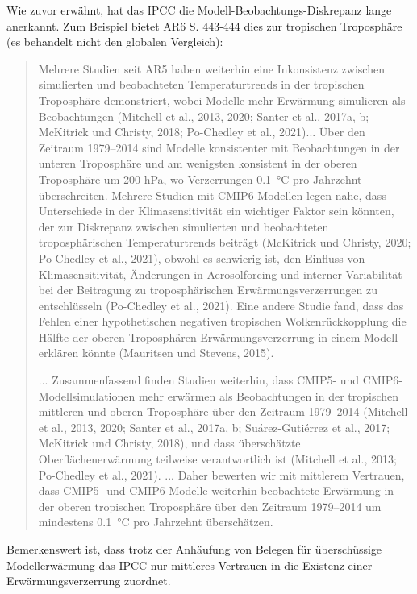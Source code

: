 \documentclass[12pt,paper=a4,DIV=12,parskip=never,chapterprefix=false,headings=standardclasses]{scrreprt}
\begin{document}
Wie zuvor erwähnt, hat das IPCC die Modell-Beobachtungs-Diskrepanz lange anerkannt. Zum Beispiel bietet AR6 S. 443-444 dies zur tropischen Troposphäre (es behandelt nicht den globalen Vergleich):


\begin{quote}
Mehrere Studien seit AR5 haben weiterhin eine Inkonsistenz zwischen simulierten und beobachteten Temperaturtrends in der tropischen Troposphäre demonstriert, wobei Modelle mehr Erwärmung simulieren als Beobachtungen (Mitchell et al., 2013, 2020; Santer et al., 2017a, b; McKitrick und Christy, 2018; Po-Chedley et al., 2021)... Über den Zeitraum 1979–2014 sind Modelle konsistenter mit Beobachtungen in der unteren Troposphäre und am wenigsten konsistent in der oberen Troposphäre um 200 hPa, wo Verzerrungen \SI{0.1}{\celsius} pro Jahrzehnt überschreiten.
Mehrere Studien mit CMIP6-Modellen legen nahe, dass Unterschiede in der Klimasensitivität ein wichtiger Faktor sein könnten, der zur Diskrepanz zwischen simulierten und beobachteten troposphärischen Temperaturtrends beiträgt (McKitrick und Christy, 2020; Po-Chedley et al., 2021), obwohl es schwierig ist, den Einfluss von Klimasensitivität, Änderungen in Aerosolforcing und interner Variabilität bei der Beitragung zu troposphärischen Erwärmungsverzerrungen zu entschlüsseln (Po-Chedley et al., 2021). Eine andere Studie fand, dass das Fehlen einer hypothetischen negativen tropischen Wolkenrückkopplung die Hälfte der oberen Troposphären-Erwärmungsverzerrung in einem Modell erklären könnte (Mauritsen und Stevens, 2015).

... Zusammenfassend finden Studien weiterhin, dass CMIP5- und CMIP6-Modell\-simulationen mehr erwärmen als Beobachtungen in der tropischen mittleren und oberen Troposphäre über den Zeitraum 1979–2014 (Mitchell et al., 2013, 2020; Santer et al., 2017a, b; Suárez-Gutiérrez et al., 2017; McKitrick und Christy, 2018), und dass überschätzte Oberflächenerwärmung teilweise verantwortlich ist (Mitchell et al., 2013; Po-Chedley et al., 2021). ... Daher bewerten wir mit mittlerem Vertrauen, dass CMIP5- und CMIP6-Modelle weiterhin beobachtete Erwärmung in der oberen tropischen Troposphäre über den Zeitraum 1979–2014 um mindestens \SI{0.1}{\celsius} pro Jahrzehnt überschätzen.
\end{quote}

Bemerkenswert ist, dass trotz der Anhäufung von Belegen für überschüssige Modellerwärmung das IPCC nur mittleres Vertrauen in die Existenz einer Erwärmungsverzerrung zuordnet.
\end{document}
